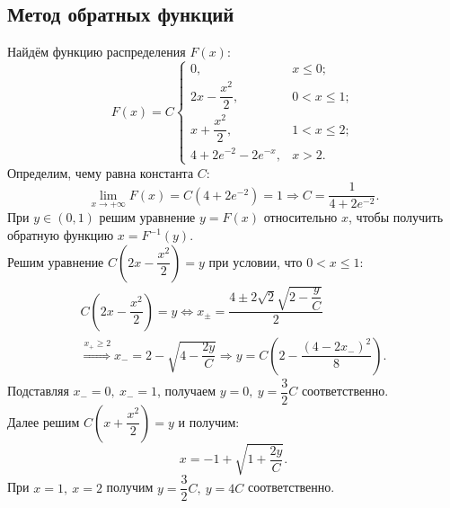 \documentclass[specialist,
substylefile = spbu_report.rtx,
subf,href,colorlinks=true, 12pt]{disser}
\begin{document}
	\subsection{Метод обратных функций}
	Найдём функцию распределения $F(x)$:
	\begin{equation*}
		F(x) =C
		\begin{cases}
			0, & x \leqslant 0;\\
			2x - \dfrac{x^2}{2}, & 0 < x \leqslant 1;\\
			x + \dfrac{x^2}{2},&1<x\leqslant 2;\\
			4 + 2e^{-2}- 2e^{-x},&x>2.
		\end{cases}
	\end{equation*}
	Определим, чему равна константа $C$:
	\begin{equation*}
		\lim_{x\rightarrow+\infty}F(x) = C(4+2e^{-2})= 1 \Rightarrow C=\dfrac{1}{4+2e^{-2}}. 
	\end{equation*}
	При $y\in(0,1)$ решим уравнение $y=F(x)$ относительно $x$, чтобы получить обратную функцию $x = F^{-1}(y)$.
	\\ Решим уравнение $C(2x-\dfrac{x^2}{2})=y$ при условии, что $0 < x \leqslant 1$:
	\begin{align*}
			C\left(2x-\dfrac{x^2}{2}\right)=y \Leftrightarrow x_{\pm}=\dfrac{4\pm2\sqrt{2}\sqrt{2 - \dfrac{y}{C}}}{2}\\
			\stackrel{x_+\geqslant2}{\Rightarrow}x_-=2-\sqrt{4 - \dfrac{2y}{C}}\Rightarrow y=C\left(2-\dfrac{(4-2x_-)^2}{8}\right).
	\end{align*}
	Подставляя $x_-=0,~x_-=1$, получаем $y = 0,~ y = \dfrac{3}{2}C$ соответственно.
	\\Далее решим $C(x+\dfrac{x^2}{2}) = y$ и получим:
	\begin{equation*}
		x =-1+\sqrt{1+\dfrac{2y}{C}}.
	\end{equation*}
	При $x=1, ~x=2$ получим $y=\dfrac{3}{2}C,~y=4C$ соответственно.\\
\end{document}
